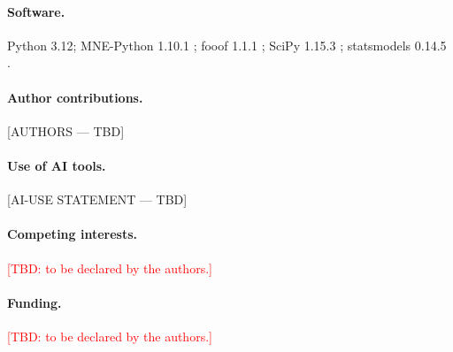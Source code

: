 \documentclass[11pt,a4paper]{article}
\newcommand{\TBD}[1]{\textcolor{red}{[TBD: #1]}}
\begin{document}
\paragraph{Software.} Python 3.12; MNE-Python 1.10.1 \citep{gramfort2013}; fooof 1.1.1
\citep{donoghue2020}; SciPy 1.15.3 \citep{virtanen2020}; statsmodels 0.14.5
\citep{seabold2010}.

\paragraph{Author contributions.} [AUTHORS --- TBD]

\paragraph{Use of AI tools.} [AI-USE STATEMENT --- TBD]

\paragraph{Competing interests.} \TBD{to be declared by the authors.}

\paragraph{Funding.} \TBD{to be declared by the authors.}




\end{document}
